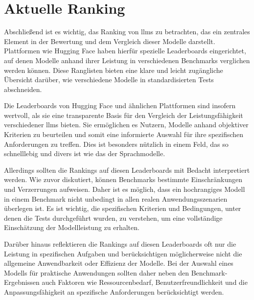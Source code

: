 \section{Aktuelle Ranking} \label{sec:aktuelle_rankings}
Abschließend ist es wichtig, das Ranking von \acp{llm} zu betrachten, das ein zentrales Element in der Bewertung und dem Vergleich dieser Modelle darstellt. Plattformen wie Hugging Face haben hierfür spezielle Leaderboards eingerichtet, auf denen Modelle anhand ihrer Leistung in verschiedenen Benchmarks verglichen werden können. Diese Ranglisten bieten eine klare und leicht zugängliche Übersicht darüber, wie verschiedene Modelle in standardisierten Tests abschneiden.

Die Leaderboards von Hugging Face und ähnlichen Plattformen sind insofern wertvoll, als sie eine transparente Basis für den Vergleich der Leistungsfähigkeit verschiedener \acp{llm} bieten. Sie ermöglichen es Nutzern, Modelle anhand objektiver Kriterien zu beurteilen und somit eine informierte Auswahl für ihre spezifischen Anforderungen zu treffen. Dies ist besonders nützlich in einem Feld, das so schnelllebig und divers ist wie das der Sprachmodelle.

Allerdings sollten die Rankings auf diesen Leaderboards mit Bedacht interpretiert werden. Wie zuvor diskutiert, können Benchmarks bestimmte Einschränkungen und Verzerrungen aufweisen. Daher ist es möglich, dass ein hochrangiges Modell in einem Benchmark nicht unbedingt in allen realen Anwendungsszenarien überlegen ist. Es ist wichtig, die spezifischen Kriterien und Bedingungen, unter denen die Tests durchgeführt wurden, zu verstehen, um eine vollständige Einschätzung der Modellleistung zu erhalten.

Darüber hinaus reflektieren die Rankings auf diesen Leaderboards oft nur die Leistung in spezifischen Aufgaben und berücksichtigen möglicherweise nicht die allgemeine Anwendbarkeit oder Effizienz der Modelle. Bei der Auswahl eines Modells für praktische Anwendungen sollten daher neben den Benchmark-Ergebnissen auch Faktoren wie Ressourcenbedarf, Benutzerfreundlichkeit und die Anpassungsfähigkeit an spezifische Anforderungen berücksichtigt werden.